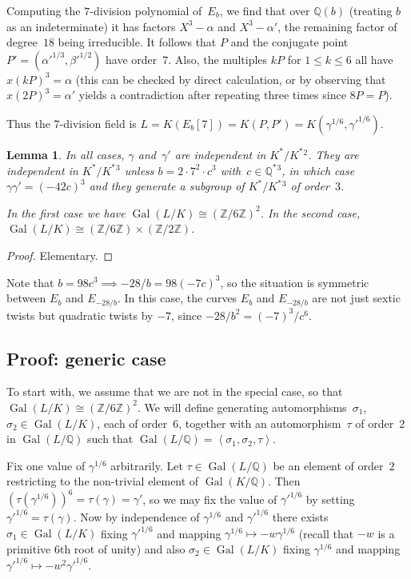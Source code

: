 \documentclass[12pt]{amsart}
\newcommand{\Q}{\mathbb{Q}}
\newcommand{\Z}{\mathbb{Z}}
\DeclareMathOperator{\Gal}{Gal}
\numberwithin{equation}{section}
\newtheorem{lemma}[theorem]{Lemma}
\theoremstyle{definition}
\theoremstyle{remark}
\begin{document}
Computing the $7$-division polynomial of~$E_b$, we find that over
$\Q(b)$ (treating $b$ as an indeterminate) it has factors $X^3-\alpha$
and $X^3-\alpha'$, the remaining factor of degree~$18$ being
irreducible.  It follows that $P$ and the conjugate point
$P'=(\alpha'^{1/3},\beta'^{1/2})$ have order~$7$.  Also, the multiples
$kP$ for $1\le k\le6$ all have $x(kP)^3=\alpha$ (this can be checked
by direct calculation, or by observing that $x(2P)^3=\alpha'$ yields a
contradiction after repeating three times since $8P=P$).

Thus the $7$-division field is
$L=K(E_b[7])=K(P,P')=K(\gamma^{1/6},\gamma'^{1/6})$.

\begin{lemma}In all cases, $\gamma$ and~$\gamma'$ are independent in
  $K^*/K^*{}^2$.  They are independent in $K^*/K^*{}^3$ unless
  $b=2\cdot7^2\cdot c^3$ with~$c\in\Q^*{}^3$, in which case
  $\gamma\gamma'=(-42c)^3$ and they generate a subgroup of $K^*/K^*{}^3$
  of order~$3$.

In the first case we have $\Gal(L/K)\cong(\Z/6\Z)^2$.  In the second
case, $\Gal(L/K)\cong(\Z/6\Z)\times(\Z/2\Z)$.
\end{lemma}
\begin{proof}
Elementary.
\end{proof}
Note that $b=98c^3\implies -28/b=98(-7c)^3$, so the situation is
symmetric between $E_b$ and $E_{-28/b}$.  In this case, the curves
$E_b$ and $E_{-28/b}$ are not just sextic twists but quadratic twists
by $-7$, since $-28/b^2=(-7)^3/c^6$.

\subsection{Proof: generic case}

To start with, we assume that we are not in the special case, so that
$\Gal(L/K)\cong(\Z/6\Z)^2$.  We will define generating
automorphisms~$\sigma_1$, $\sigma_2\in\Gal(L/K)$, each of order~$6$, together
with an automorphism~$\tau$ of order~$2$ in $\Gal(L/\Q)$ such that
$\Gal(L/\Q)=\left<\sigma_1,\sigma_2,\tau\right>$.

Fix one value of $\gamma^{1/6}$ arbitrarily.  Let $\tau\in\Gal(L/\Q)$
be an element of order~$2$ restricting to the non-trivial element of
$\Gal(K/\Q)$.  Then $(\tau(\gamma^{1/6}))^6=\tau(\gamma)=\gamma'$, so
we may fix the value of $\gamma'^{1/6}$ by setting
$\gamma'^{1/6}=\tau(\gamma)$.  Now by independence of $\gamma^{1/6}$
and $\gamma'^{1/6}$ there exists $\sigma_1\in\Gal(L/K)$ fixing
$\gamma'^{1/6}$ and mapping $\gamma^{1/6}\mapsto-w\gamma^{1/6}$ (recall
that $-w$ is a primitive $6$th root of unity) and also
$\sigma_2\in\Gal(L/K)$ fixing $\gamma^{1/6}$ and mapping
$\gamma'^{1/6}\mapsto-w^2\gamma'^{1/6}$.
\end{document}

